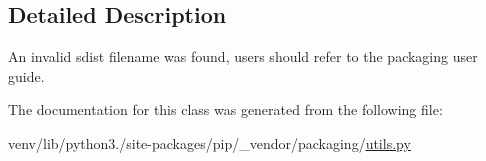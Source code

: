 \subsection{Detailed Description}
\begin{DoxyVerb}An invalid sdist filename was found, users should refer to the packaging user guide.
\end{DoxyVerb}
 

The documentation for this class was generated from the following file\+:\begin{DoxyCompactItemize}
\item 
venv/lib/python3./site-\/packages/pip/\+\_\+vendor/packaging/\hyperlink{pip_2__vendor_2packaging_2utils_8py}{utils.\+py}\end{DoxyCompactItemize}
